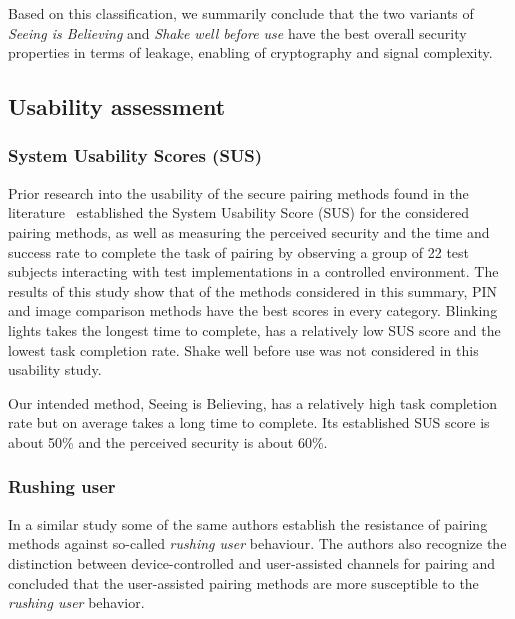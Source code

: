 \documentclass[conference, 11pt]{sty/IEEEtran}
\begin{document}
Based on this classification, we summarily conclude that the two variants of \textit{Seeing is Believing} and \textit{Shake well before use} have the best overall security properties in terms of leakage, enabling of cryptography and signal complexity.


\subsection{Usability assessment}
\label{ssec:usability_assessment}

\subsubsection{System Usability Scores (SUS)}
Prior research into the usability of the secure pairing methods found in the literature~\cite{kumar2009comparative} established the System Usability Score (SUS) for the considered pairing methods, as well as measuring the perceived security and the time and success rate to complete the task of pairing by observing a group of 22 test subjects interacting with test implementations in a controlled environment.
The results of this study show that of the methods considered in this summary, PIN and image comparison methods have the best scores in every category.
Blinking lights takes the longest time to complete, has a relatively low SUS score and the lowest task completion rate.
Shake well before use was not considered in this usability study.

Our intended method, Seeing is Believing, has a relatively high task completion rate but on average takes a long time to complete.
Its established SUS score is about 50\% and the perceived security is about 60\%.

\subsubsection{Rushing user}
In a similar study \cite{kobsa2009serial} some of the same authors establish the resistance of pairing methods against so-called \textit{rushing user} behaviour.
The authors also recognize the distinction between device-controlled and user-assisted channels for pairing and concluded that the user-assisted pairing methods are more susceptible to the \textit{rushing user} behavior.
\end{document}
